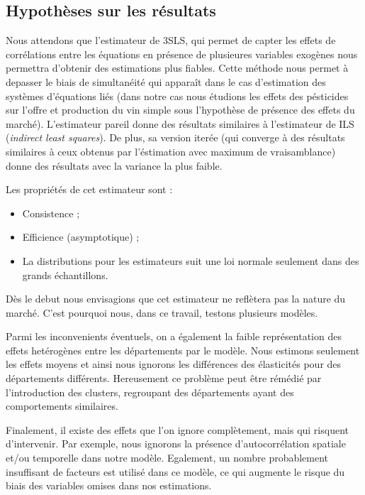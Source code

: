 \documentclass[11pt,]{article}
\providecommand{\tightlist}{%
  \setlength{\itemsep}{0pt}\setlength{\parskip}{0pt}}
\begin{document}
\hypertarget{hypotheses-sur-les-resultats}{%
\subsection{Hypothèses sur les
résultats}\label{hypotheses-sur-les-resultats}}

Nous attendons que l'estimateur de 3SLS, qui permet de capter les effets
de corrélations entre les équations en présence de plusieures variables
exogènes nous permettra d'obtenir des estimations plus fiables. Cette
méthode nous permet à depasser le biais de simultanéité qui apparaît
dans le cas d'estimation des systèmes d'équations liés (dans notre cas
nous étudions les effets des pésticides sur l'offre et production du vin
simple sous l'hypothèse de présence des effets du marché). L'estimateur
pareil donne des résultats similaires à l'estimateur de ILS
(\emph{indirect least squares}). De plus, sa version iterée (qui
converge à des résultats similaires à ceux obtenus par l'éstimation avec
maximum de vraisamblance) donne des résultats avec la variance la plus
faible.

Les propriétés de cet estimateur sont :

\begin{itemize}
\tightlist
\item
  Consistence ;
\item
  Efficience (asymptotique) ;
\item
  La distributions pour les estimateurs suit une loi normale seulement
  dans des grands échantillons.
\end{itemize}

Dès le debut nous envisagions que cet estimateur ne reflètera pas la
nature du marché. C'est pourquoi nous, dans ce travail, testons
plusieurs modèles.

Parmi les inconvenients éventuels, on a également la faible
représentation des effets hetérogènes entre les départements par le
modèle. Nous estimons seulement les effets moyens et ainsi nous ignorons
les différences des élasticités pour des départements différents.
Hereusement ce problème peut être rémédié par l'introduction des
clusters, regroupant des départements ayant des comportements
similaires.

Finalement, il existe des effets que l'on ignore complètement, mais qui
risquent d'intervenir. Par exemple, nous ignorons la présence
d'autocorrélation spatiale et/ou temporelle dans notre modèle.
Egalement, un nombre probablement insuffisant de facteurs est utilisé
dans ce modèle, ce qui augmente le risque du biais des variables omises
dans nos estimations.
\end{document}
